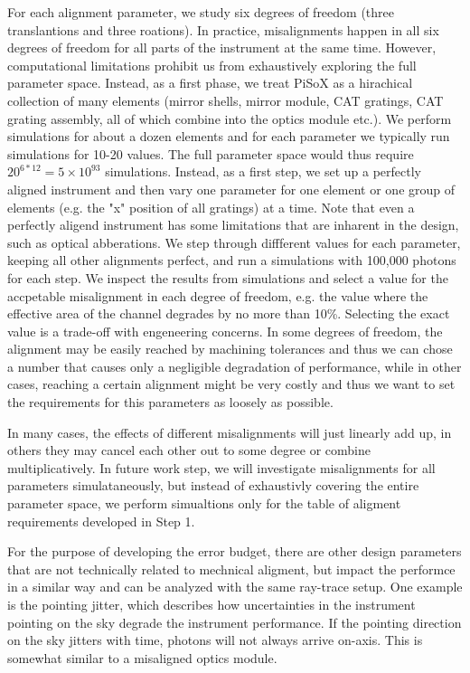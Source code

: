 \documentclass[]{spie}  %
\begin{document}
For each alignment parameter, we study six degrees of freedom (three
translantions and three roations). In practice, misalignments happen
in all six degrees of freedom for all parts of the instrument at the
same time. However, computational limitations prohibit us from
exhaustively exploring the full parameter space. Instead, as a first
phase, we treat PiSoX as a hirachical collection of many elements
(mirror shells, mirror module, CAT gratings, CAT grating assembly, all
of which combine into the optics module etc.). We perform simulations
for about a dozen elements and for each parameter we typically run
simulations for 10-20 values. The full parameter space would thus
require $20^{6*12}=5\times 10^{93}$ simulations. Instead, as a first
step, we set up a perfectly aligned instrument and then vary one
parameter for one element or one group of elements (e.g. the "x"
position of all gratings) at a time. Note that even a perfectly
aligend instrument has some limitations that are inharent in the
design, such as optical abberations. We step through diffferent values
for each parameter, keeping all other alignments perfect, and run a
simulations with 100,000 photons for each step. We inspect the results
from simulations and select a value for the accpetable misalignment in
each degree of freedom, e.g. the value where the effective area of the
channel degrades by no more than 10\%. Selecting the exact value is a
trade-off with engeneering concerns. In some degrees of freedom, the
alignment may be easily reached by machining tolerances and thus we
can chose a number that causes only a negligible degradation of
performance, while in other cases, reaching a certain alignment might
be very costly and thus we want to set the requirements for this
parameters as loosely as possible.

In many cases, the effects of different misalignments will just
linearly add up, in others they may cancel each other out to some
degree or combine multiplicatively. In future work step, we will
investigate misalignments for all parameters simulataneously, but
instead of exhaustivly covering the entire parameter space, we perform
simualtions only for the table of aligment requirements developed in
Step 1.

For the purpose of developing the error budget, there are other design
parameters that are not technically related to mechnical aligment, but
impact the performce in a similar way and can be analyzed with the
same ray-trace setup. One example is the pointing jitter, which
describes how uncertainties in the instrument pointing on the sky
degrade the instrument performance. If the pointing direction on the
sky jitters with time, photons will not always arrive on-axis. This is
somewhat similar to a misaligned optics module.
\end{document}

